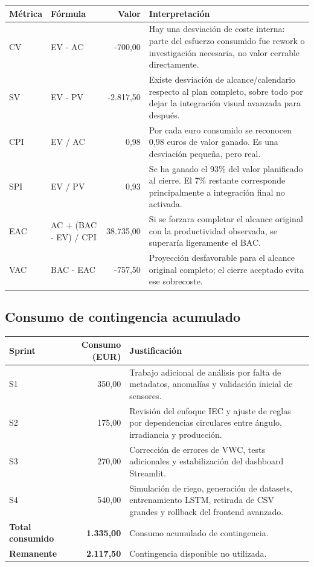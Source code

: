 \documentclass[11pt,a4paper]{article}
\begin{document}
\begin{table}[H]
\centering
\begin{tabular}{p{3cm}p{4cm}r p{6cm}}
\toprule
\textbf{Métrica} & \textbf{Fórmula} & \textbf{Valor} & \textbf{Interpretación} \\
\midrule
CV & EV - AC & -700,00 & Hay una desviación de coste interna: parte del esfuerzo consumido fue rework o investigación necesaria, no valor cerrable directamente. \\
SV & EV - PV & -2.817,50 & Existe desviación de alcance/calendario respecto al plan completo, sobre todo por dejar la integración visual avanzada para después. \\
CPI & EV / AC & 0,98 & Por cada euro consumido se reconocen 0,98 euros de valor ganado. Es una desviación pequeña, pero real. \\
SPI & EV / PV & 0,93 & Se ha ganado el 93\% del valor planificado al cierre. El 7\% restante corresponde principalmente a integración final no activada. \\
EAC & AC + (BAC - EV) / CPI & 38.735,00 & Si se forzara completar el alcance original con la productividad observada, se superaría ligeramente el BAC. \\
VAC & BAC - EAC & -757,50 & Proyección desfavorable para el alcance original completo; el cierre aceptado evita ese sobrecoste. \\
\bottomrule
\end{tabular}
\end{table}

\subsection{Consumo de contingencia acumulado}

\begin{table}[H]
\centering
\begin{tabular}{p{1.5cm}r p{9cm}}
\toprule
\textbf{Sprint} & \textbf{Consumo (EUR)} & \textbf{Justificación} \\
\midrule
S1 & 350,00 & Trabajo adicional de análisis por falta de metadatos, anomalías y validación inicial de sensores. \\
S2 & 175,00 & Revisión del enfoque IEC y ajuste de reglas por dependencias circulares entre ángulo, irradiancia y producción. \\
S3 & 270,00 & Corrección de errores de VWC, tests adicionales y estabilización del dashboard Streamlit. \\
S4 & 540,00 & Simulación de riego, generación de datasets, entrenamiento LSTM, retirada de CSV grandes y rollback del frontend avanzado. \\
\midrule
\textbf{Total consumido} & \textbf{1.335,00} & Consumo acumulado de contingencia. \\
\textbf{Remanente} & \textbf{2.117,50} & Contingencia disponible no utilizada. \\
\bottomrule
\end{tabular}
\end{table}
\end{document}
